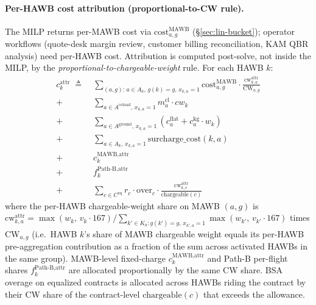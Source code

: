 \documentclass[11pt,a4paper]{article}
\newcommand{\defeq}{\triangleq}
\theoremstyle{definition}
\begin{document}
\paragraph{Per-HAWB cost attribution (proportional-to-CW rule).}
The MILP returns per-MAWB cost via $\text{cost}^{\text{MAWB}}_{a,g}$
(\S\ref{sec:lin-bucket}); operator workflows (quote-desk margin review,
customer billing reconciliation, KAM QBR analysis) need per-HAWB cost.
Attribution is computed post-solve, not inside the MILP, by the
\emph{proportional-to-chargeable-weight} rule. For each HAWB $k$:
\begin{align}
  c_k^{\text{attr}} \;\defeq\;
    & \sum_{(a, g) :\, a \in A_k,\, g(k) = g,\, x_{k,a} = 1}
      \text{cost}^{\text{MAWB}}_{a,g} \cdot
      \frac{\text{cw}^{\text{attr}}_{k, a}}{\text{CW}_{a, g}}
    \tag{air bucket cost share} \\
  +\;
    & \sum_{a \in A^{\text{coload}},\, x_{k,a} = 1}
      m_a^{\text{cl}} \cdot cw_k
    \tag{co-load per-kg, direct} \\
  +\;
    & \sum_{a \in A^{\text{ground}},\, x_{k,a} = 1}
      (c_a^{\text{flat}} + c_a^{\text{kg}} \cdot w_k)
    \tag{ground arcs, direct} \\
  +\;
    & \sum_{a \in A_k,\, x_{k,a} = 1}
      \text{surcharge\_cost}(k, a)
    \tag{Path-A surcharges, direct} \\
  +\;
    & c^{\text{MAWB,attr}}_{k}
    \tag{MAWB fixed-charge share} \\
  +\;
    & f^{\text{Path-B},\text{attr}}_{k}
    \tag{Path-B per-flight share} \\
  +\;
    & \sum_{c \in C^{\text{eq}}}
      r_c \cdot \text{over}_c \cdot
      \frac{\text{cw}^{\text{attr}}_{k, c}}{\text{chargeable}(c)}
    \tag{BSA overage share, equalized}
  \label{eq:per-hawb-attribution}
\end{align}
where the per-HAWB chargeable-weight share on MAWB $(a, g)$ is
$\text{cw}^{\text{attr}}_{k, a} = \max(w_k,\, v_k \cdot 167) / \sum_{k' \in
K_a : g(k') = g,\, x_{k', a} = 1} \max(w_{k'},\, v_{k'} \cdot 167)$
times $\text{CW}_{a, g}$ (i.e.\ HAWB $k$'s share of MAWB chargeable
weight equals its per-HAWB pre-aggregation contribution as a fraction of
the sum across activated HAWBs in the same group). MAWB-level
fixed-charge $c^{\text{MAWB,attr}}_{k}$ and Path-B per-flight shares
$f^{\text{Path-B},\text{attr}}_{k}$ are allocated proportionally by the
same CW share. BSA overage on equalized contracts is allocated across
HAWBs riding the contract by their CW share of the contract-level
$\text{chargeable}(c)$ that exceeds the allowance.
\end{document}
